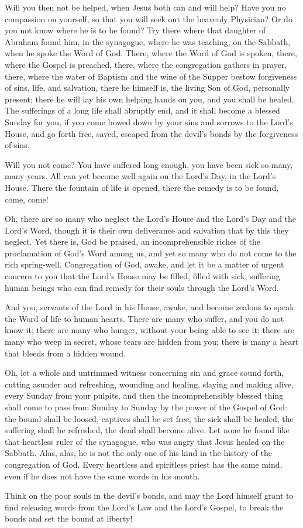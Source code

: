 Will you then not be helped, when Jesus both can and will help? Have you no compassion on yourself, so that you will seek out the heavenly Physician? Or do you not know where he is to be found? Try there where that daughter of Abraham found him, in the synagogue, where he was teaching, on the Sabbath, when he spoke the Word of God. There, where the Word of God is spoken, there, where the Gospel is preached, there, where the congregation gathers in prayer, there, where the water of Baptism and the wine of the Supper bestow forgiveness of sins, life, and salvation, there he himself is, the living Son of God, personally present; there he will lay his own helping hands on you, and you shall be healed. The sufferings of a long life shall abruptly end, and it shall become a blessed Sunday for you, if you come bowed down by your sins and sorrows to the Lord’s House, and go forth free, saved, escaped from the devil’s bonds by the forgiveness of sins.

Will you not come? You have suffered long enough, you have been sick so many, many years. All can yet become well again on the Lord’s Day, in the Lord’s House. There the fountain of life is opened, there the remedy is to be found, come, come!

Oh, there are so many who neglect the Lord’s House and the Lord’s Day and the Lord’s Word, though it is their own deliverance and salvation that by this they neglect. Yet there is, God be praised, an incomprehensible riches of the proclamation of God’s Word among us, and yet so many who do not come to the rich spring-well. Congregation of God, awake, and let it be a matter of urgent concern to you that the Lord’s House may be filled, filled with sick, suffering human beings who can find remedy for their souls through the Lord’s Word.

And you, servants of the Lord in his House, awake, and become zealous to speak the Word of life to human hearts. There are many who suffer, and you do not know it; there are many who hunger, without your being able to see it; there are many who weep in secret, whose tears are hidden from you; there is many a heart that bleeds from a hidden wound.

Oh, let a whole and untrimmed witness concerning sin and grace sound forth, cutting asunder and refreshing, wounding and healing, slaying and making alive, every Sunday from your pulpits, and then the incomprehensibly blessed thing shall come to pass from Sunday to Sunday by the power of the Gospel of God: the bound shall be loosed, captives shall be set free, the sick shall be healed, the suffering shall be refreshed, the dead shall become alive. Let none be found like that heartless ruler of the synagogue, who was angry that Jesus healed on the Sabbath. Alas, alas, he is not the only one of his kind in the history of the congregation of God. Every heartless and spiritless priest has the same mind, even if he does not have the same words in his mouth.

Think on the poor souls in the devil’s bonds, and may the Lord himself grant to find releasing words from the Lord’s Law and the Lord’s Gospel, to break the bonds and set the bound at liberty!


